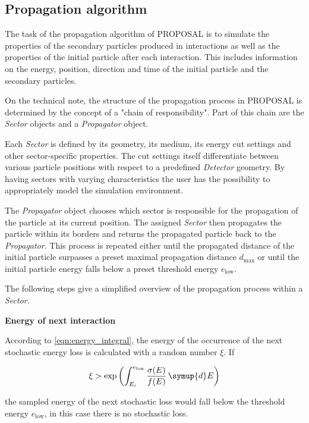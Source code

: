 \subsection{Propagation algorithm}
\label{sec:algorithm}

The task of the propagation algorithm of PROPOSAL is to simulate the properties of the secondary particles produced in interactions as well as the properties of the initial particle after each interaction.
This includes information on the energy, position, direction and time of the initial particle and the secondary particles.

On the technical note, the structure of the propagation process in PROPOSAL is determined by the concept of a "chain of responsibility".
Part of this chain are the \emph{Sector} objects and a \emph{Propagator} object.

Each \emph{Sector} is defined by its geometry, its medium, its energy cut settings and other sector-specific properties.
The cut settings itself differentiate between various particle positions with respect to a predefined \emph{Detector} geometry.
By having sectors with varying characteristics the user has the possibility to appropriately model the simulation environment.

The \emph{Propagator} object chooses which sector is responsible for the propagation of the particle at its current position.
The assigned \emph{Sector} then propagates the particle within its borders and returns the propagated particle back to the \emph{Propagator}.
This process is repeated either until the propagated distance of the initial particle surpasses a preset maximal propagation distance $d_\text{max}$ or until the initial particle energy falls below a preset threshold energy $e_\text{low}$.

The following steps give a simplified overview of the propagation process within a \emph{Sector}.

\textbf{Energy of next interaction}

According to \ref{eqn:energy_integral}, the energy of the occurrence of the next stochastic energy loss is calculated with a random number $\xi$.
If

\begin{equation}
	\xi > \exp{\left( \int_{E_i}^{e_\text{low}} \frac{\sigma(E)}{f(E)} \, \symup{d}E \right)}
\end{equation}

the sampled energy of the next stochastic loss would fall below the threshold energy $e_\text{low}$, in this case there is no stochastic loss.

